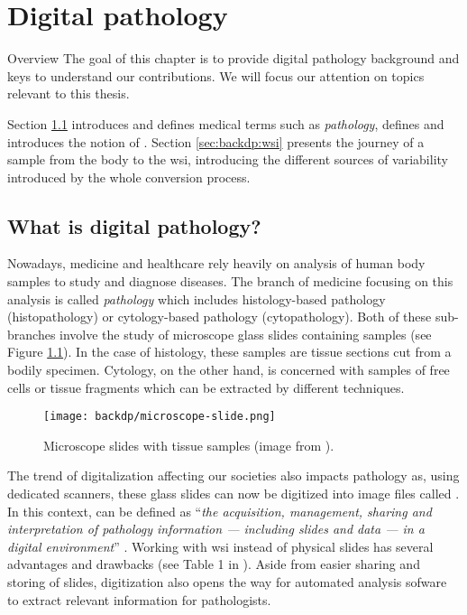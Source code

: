 \chapter{Digital pathology}
\label{chap:backdp}

\begin{overview}{Overview}
  The goal of this chapter is to provide digital pathology background  and keys to understand our contributions. We will focus our attention on topics relevant to this thesis. 
  
  Section \ref{sec:backdp:whatisdp} introduces and defines medical terms such as \textit{pathology}, defines  and introduces the notion of . Section \ref{sec:backdp:wsi} presents the journey of a sample from the body to the \acrshort{wsi}, introducing the different sources of variability introduced by the whole conversion process. 
\end{overview}


\section{What is digital pathology?}
\label{sec:backdp:whatisdp}

Nowadays, medicine and healthcare rely heavily on analysis of human body samples to study and diagnose diseases. The branch of medicine focusing on this analysis is called \textit{pathology} which includes histology-based pathology (\aka histopathology) or cytology-based pathology (\aka cytopathology). Both of these sub-branches involve the study of microscope glass slides containing samples (see Figure \ref{fig:backdp:glassslides}). In the case of histology, these samples are tissue sections cut from a bodily specimen. Cytology, on the other hand, is concerned with samples of free cells or tissue fragments which can be extracted by different techniques. 

\begin{figure}
  \centering
  \texttt{[image: backdp/microscope-slide.png]}
  \caption{Microscope slides with tissue samples (image from \parencite{img:glassslides}).}
  \label{fig:backdp:glassslides}
\end{figure}

The trend of digitalization affecting our societies also impacts pathology as, using dedicated scanners, these glass slides can now be digitized into image files called . In this context,  can be defined as ``\textit{the acquisition, management, sharing and interpretation of pathology information — including slides and data — in a digital environment}'' \parencite{doolan2019whatisdp}. Working with \acrshort{wsi} instead of physical slides has several advantages and drawbacks (see Table 1 in \parencite{jahn2020digital}). Aside from easier sharing and storing of slides, digitization also opens the way for automated analysis sofware to extract relevant information for pathologists.

